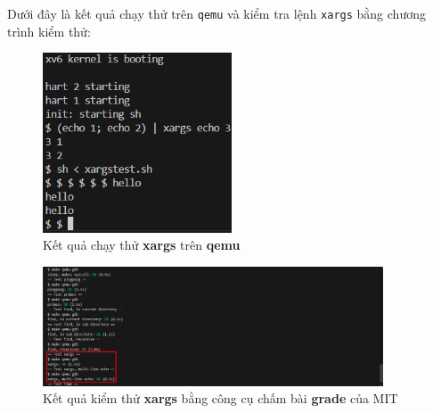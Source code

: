 Dưới đây là kết quả chạy thử trên \verb|qemu| và kiểm tra lệnh \verb|xargs| bằng chương trình kiểm thử:
\begin{figure}[htp!]
	\centering
	\includegraphics[width=0.5\textwidth]{figures/exec-xargs}
	\caption{Kết quả chạy thử \textbf{xargs} trên \textbf{qemu}}
\end{figure}
\begin{figure}[htp!]
	\centering
	\includegraphics[width=0.9\textwidth]{figures/xargs-test}
	\caption{Kết quả kiểm thử \textbf{xargs} bằng công cụ chấm bài \textbf{grade} của MIT}
\end{figure}